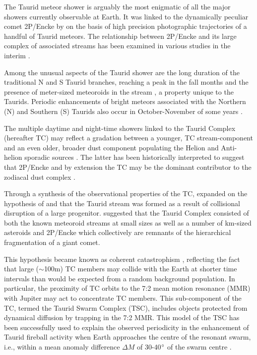 \documentclass[letters,a4paper,fleqn,usenatbib]{mnras}
\begin{document}
The Taurid meteor shower is arguably the most enigmatic of all the major showers currently observable at Earth. It was linked to the dynamically peculiar comet 2P/Encke by \cite{Whipple1940} on the basis of high precision photographic trajectories of a handful of Taurid meteors. The relationship between 2P/Encke and its large complex of associated streams has been examined in various studies in the interim \citep{Whipple1952, Jones1986, Steel1991, Stohl1992,Asher1993b}. 

Among the unusual aspects of the Taurid shower are the long duration of the traditional N and S Taurid branches, reaching a peak in the fall months \citep{Brown2010} and the presence of meter-sized meteoroids in the stream \citep{Spurny2017}, a property unique to the Taurids. Periodic enhancements of bright meteors associated with the Northern (N) and Southern (S) Taurids also occur in October-November of some years \citep{Beech2004a, Dubietis2007}.

The multiple daytime and night-time showers linked to the Taurid Complex (hereafter TC) \citep{Steel1991, Babadzhanov1992} may reflect a gradation between a younger, TC stream-component and an even older, broader dust component populating the Helion and Anti-helion sporadic sources \citep{Stohl1983, Stohl1992}. The latter has been historically interpreted to suggest that 2P/Encke and by extension the TC may be the dominant contributor to the zodiacal dust complex \citep{Whipple1952, Whipple1967, Wiegert2009}.

Through a synthesis of the observational properties of the TC, \cite{Clube1984} expanded on the hypothesis of \cite{Whipple1940} and \cite{Whipple1952} that the Taurid stream was formed as a result of collisional disruption of a large progenitor. \cite{Clube1984} suggested that the Taurid Complex consisted of both the known meteoroid streams at small sizes as well as a number of km-sized asteroids and 2P/Encke which collectively are remnants of the hierarchical fragmentation of a giant comet. 

This hypothesis became known as coherent catastrophism \citep{Asher1994}, reflecting the fact that large ($\sim$100m) TC members may collide with the Earth at shorter time intervals than would be expected from a random background population. In particular, the proximity of TC orbits to the 7:2 mean motion resonance (MMR) with Jupiter may act to concentrate TC members. This sub-component of the TC, termed the Taurid Swarm Complex (TSC), includes objects protected from dynamical diffusion by trapping in the 7:2 MMR. This model of the TSC has been successfully used to explain the observed periodicity in the enhancement of Taurid fireball activity when Earth approaches the centre of the resonant swarm, i.e., within a mean anomaly difference $\Delta M$ of 30-40$\degree$ of the swarm centre \citep{Asher1993b,Asher1998,McBeath1999,Dubietis2007,Spurny2017}. 
\end{document}
